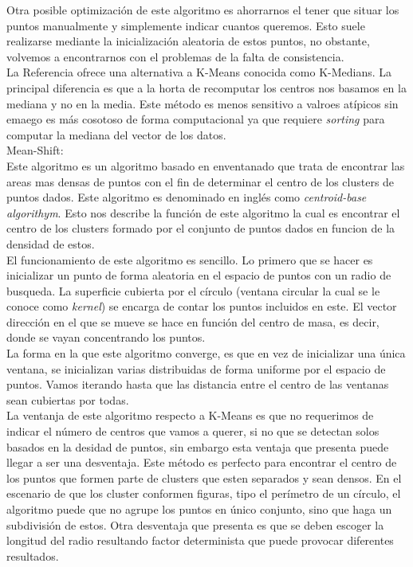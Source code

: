 \documentclass[conference,a4paper]{IEEEtran}
\begin{document}
Otra posible optimización de este algoritmo es ahorrarnos el tener que situar los puntos manualmente y simplemente indicar cuantos queremos. Esto suele realizarse mediante la inicialización aleatoria de estos puntos, no obstante, volvemos a encontrarnos con el problemas de la falta de consistencia.\\

La Referencia ofrece una alternativa a K-Means conocida como K-Medians. La principal diferencia es que a la horta de recomputar los centros nos basamos en la mediana y no en la media. Este método es menos sensitivo a valroes atípicos sin emaego es más cosotoso de forma computacional ya que requiere \textit{sorting} para computar la mediana del vector de los datos.\\

Mean-Shift:\\

Este algoritmo es un algoritmo basado en enventanado que trata de encontrar las areas mas densas de puntos con el fin de determinar el centro de los clusters de puntos dados. Este algoritmo es denominado en inglés como \textit{centroid-base algorithym}. Esto nos describe la función de este algoritmo la cual es encontrar el centro de los clusters formado por el conjunto de puntos dados en funcion de la densidad de estos.\\

El funcionamiento de este algoritmo es sencillo. Lo primero que se hacer es inicializar un punto de forma aleatoria en el espacio de puntos con un radio de busqueda. La superficie cubierta por el círculo (ventana circular la cual se le conoce como \textit{kernel}) se encarga de contar los puntos incluidos en este. El vector dirección en el que se mueve se hace en función del centro de masa, es decir, donde se vayan concentrando los puntos.\\

La forma en la que este algoritmo converge, es que en vez de inicializar una única ventana, se inicializan varias distribuidas de forma uniforme por el espacio de puntos. Vamos iterando hasta  que las distancia entre el centro de las ventanas sean cubiertas por todas.\\

La ventanja de este algoritmo respecto a K-Means es que no requerimos de indicar el número de centros que vamos a querer, si no que se detectan solos basados en la desidad de puntos, sin embargo esta ventaja que presenta puede llegar a ser una desventaja. Este método es perfecto para encontrar el centro de los puntos que formen parte de clusters que esten separados y sean densos. En el escenario de que los cluster conformen figuras, tipo el perímetro de un círculo, el algoritmo puede que no agrupe los puntos en único conjunto, sino que haga un subdivisión de estos. Otra desventaja que presenta es que se deben escoger la longitud del radio resultando factor determinista que puede provocar diferentes resultados.\\
\end{document}
